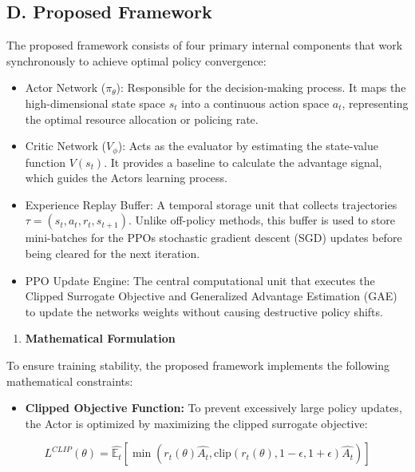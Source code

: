 \subsection{D. Proposed Framework}\label{d.-proposed-framework}

The proposed framework consists of four primary internal components that work synchronously to achieve optimal policy convergence:

\begin{itemize}
\item
  Actor Network (\(\pi_{\theta}\)): Responsible for the decision-making process. It maps the high-dimensional state space \(s_{t}\) into a continuous action space \(a_{t}\), representing the optimal resource allocation or policing rate.
\item
  Critic Network (\(V_{\phi}\)): Acts as the evaluator by estimating the state-value function \(V\left( s_{t} \right)\). It provides a baseline to calculate the advantage signal, which guides the Actor\textquotesingle s learning process.
\item
  Experience Replay Buffer: A temporal storage unit that collects trajectories \(\tau = \left( s_{t},a_{t},r_{t},s_{t + 1} \right)\). Unlike off-policy methods, this buffer is used to store mini-batches for the PPO\textquotesingle s stochastic gradient descent (SGD) updates before being cleared for the next iteration.
\item
  PPO Update Engine: The central computational unit that executes the Clipped Surrogate Objective and Generalized Advantage Estimation (GAE) to update the networks\textquotesingle{} weights without causing destructive policy shifts.
\end{itemize}

\begin{enumerate}
\def\labelenumi{\arabic{enumi})}
\item
  \textbf{Mathematical Formulation}
\end{enumerate}

To ensure training stability, the proposed framework implements the following mathematical constraints:

\begin{itemize}
\item
  \textbf{Clipped Objective Function:} To prevent excessively large policy updates, the Actor is optimized by maximizing the clipped surrogate objective:
\end{itemize}

\begin{equation}\label{eq:13}
L^{CLIP}(\theta) = \widehat{\mathbb{E}_{t}}\left\lbrack \min\left( r_{t}(\theta)\widehat{A_{t}},\text{clip}\left( r_{t}(\theta),1 - \epsilon,1 + \epsilon \right)\widehat{A_{t}} \right) \right\rbrack
\end{equation}

